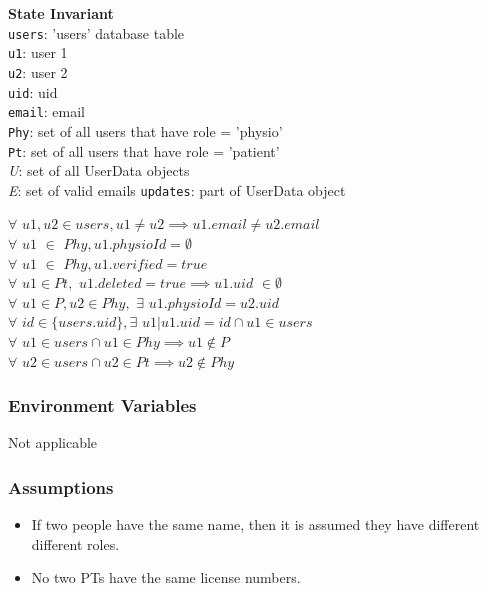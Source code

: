\documentclass[12pt, titlepage]{article}
\begin{document}
\noindent \textbf{State Invariant} \\
\texttt{users}: 'users' database table\\
\texttt{u1}: user 1\\
\texttt{u2}: user 2\\
\texttt{uid}: uid\\
\texttt{email}: email\\
\texttt{Phy}: set of all users that have role = 'physio' \\
\texttt{Pt}: set of all users that have role = 'patient' \\
\textit{U}: set of all UserData objects\\
\textit{E}: set of valid emails
\texttt{updates}: part of UserData object 


\noindent $\forall$ $u1, u2 \in users, u1 \neq u2 \implies u1.email \neq u2.email$ \\
$\forall$ $u1$ $\in$ $Phy, u1.physioId = \emptyset$ \\
$\forall$ $u1$ $\in$ $Phy, u1.verified = true$ \\
$\forall$ $u1 \in Pt,$ $u1.deleted = true \implies u1.uid$ $\in \emptyset$ \\
$\forall$ $u1 \in P, u2 \in Phy,$ $\exists$ $u1.physioId = u2.uid$ \\
$\forall$ $id \in \{users.uid\}, $$\exists$ $u1| u1.uid = id \cap u1 \in users$ \\
$\forall$ $u1 \in users \cap u1 \in Phy \implies u1 \notin P$ \\
$\forall$ $u2 \in users \cap u2 \in Pt \implies u2 \notin Phy$ \\


\subsubsection{Environment Variables}
Not applicable

\subsubsection{Assumptions}
\begin{itemize}
  \item If two people have the same name, then it is assumed they have different different roles.
  \item No two PTs have the same license numbers.
\end{itemize}
\end{document}
